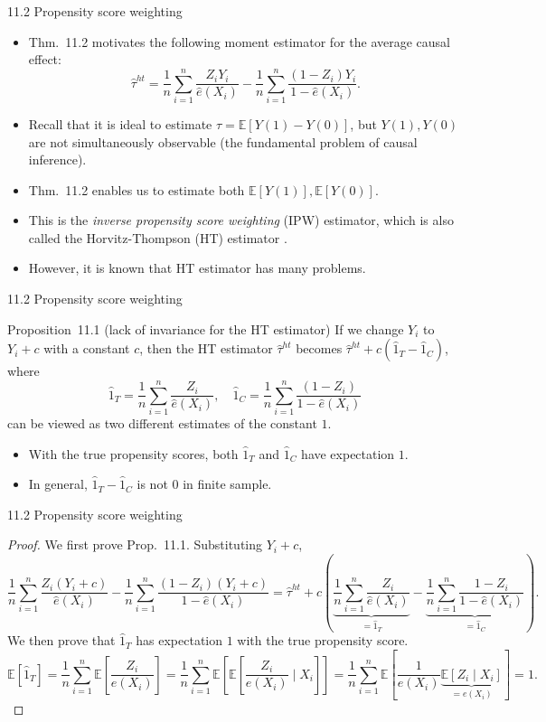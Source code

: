 \documentclass[aspectratio=169, 12pt]{beamer}
\newcommand{\E}{\mathbb{E}}
\begin{document}
\begin{frame}{11.2 Propensity score weighting}
  \begin{itemize}
    \item Thm.~11.2 motivates the following moment estimator for the average causal effect:
    \[
    \hat{\tau}^{ht} = \frac{1}{n}\sum_{i=1}^{n}\frac{Z_iY_i}{\hat{e}(X_i)}-\frac{1}{n}\sum_{i=1}^{n}\frac{(1-Z_i)Y_i}{1-\hat{e}(X_i)}.
    \]
    \item Recall that it is ideal to estimate $\tau = \mathbb{E}[Y(1)-Y(0)]$, but $Y(1),Y(0)$ are not simultaneously observable (the fundamental problem of causal inference).
    \item Thm.~11.2 enables us to estimate both $\E[Y(1)],\E[Y(0)]$.
    \item This is the \textit{inverse propensity score weighting} (IPW) estimator, which is also called the Horvitz-Thompson (HT) estimator \citep{horvitz1952generalization}.
    \item However, it is known that HT estimator has many problems.
  \end{itemize}
\end{frame}

\begin{frame}{11.2 Propensity score weighting}
  \begin{keybox}{Proposition~11.1 (lack of invariance for the HT estimator)}
    If we change $Y_i$ to $Y_i+c$ with a constant $c$, then the HT estimator $\hat{\tau}^{ht}$ becomes $\hat{\tau}^{ht}+c(\hat{1}_{T}-\hat{1}_C)$, where
    \[
    \hat{1}_T = \frac{1}{n}\sum_{i=1}^{n}\frac{Z_i}{\hat{e}(X_i)},\quad \hat{1}_C = \frac{1}{n}\sum_{i=1}^{n}\frac{(1-Z_i)}{1-\hat{e}(X_i)}
    \]
    can be viewed as two different estimates of the constant $1$.
  \end{keybox}
  \begin{itemize}
    \item With the true propensity scores, both $\hat{1}_T$ and $\hat{1}_C$ have expectation $1$.
    \item In general, $\hat{1}_{T}-\hat{1}_C$ is not $0$ in finite sample.
  \end{itemize}
\end{frame}

\begin{frame}{11.2 Propensity score weighting}
  \small
  \begin{proof}
    We first prove Prop.~11.1. Substituting $Y_i+c$,
    \[
    \frac{1}{n}\sum_{i=1}^{n}\frac{Z_i(Y_i+c)}{\hat{e}(X_i)} - \frac{1}{n}\sum_{i=1}^{n}\frac{(1-Z_i)(Y_i+c)}{1-\hat{e}(X_i)} = \hat{\tau}^{ht} + c\left(\underbrace{\frac{1}{n}\sum_{i=1}^{n}\frac{Z_i}{\hat{e}(X_i)}}_{=\hat{1}_T} - \underbrace{\frac{1}{n}\sum_{i=1}^{n}\frac{1-Z_i}{1-\hat{e}(X_i)}}_{=\hat{1}_C}\right).
    \]
    We then prove that $\hat{1}_T$ has expectation $1$ with the true propensity score.
    \[
    \E[\hat{1}_T] = \frac{1}{n}\sum_{i=1}^{n}\E\left[\frac{Z_i}{e(X_i)}\right] = \frac{1}{n}\sum_{i=1}^{n}\E\left[\E\left[\frac{Z_i}{e(X_i)}\mid X_i\right]\right] = \frac{1}{n}\sum_{i=1}^{n}\E\left[\frac{1}{e(X_i)}\underbrace{\E\left[Z_i\mid X_i\right]}_{=e(X_i)}\right]=1.
    \]
  \end{proof}
\end{frame}
\end{document}
